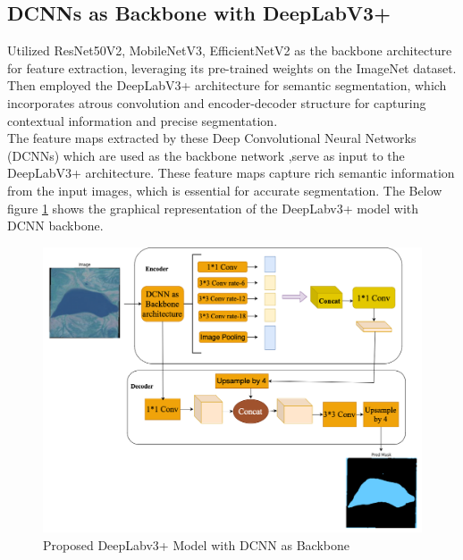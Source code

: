 \subsection{DCNNs as Backbone with DeepLabV3+}
Utilized ResNet50V2, MobileNetV3, EfficientNetV2 as the backbone architecture for feature extraction, leveraging its pre-trained weights on the ImageNet dataset.\\
Then employed the DeepLabV3+ architecture for semantic segmentation, which incorporates atrous convolution and encoder-decoder structure for capturing contextual information and precise segmentation.\\
The feature maps extracted by these Deep Convolutional Neural Networks (DCNNs) which are used as the backbone network ,serve as
input to the DeepLabV3+ architecture. These feature maps capture rich semantic information from the input images, which is essential for accurate segmentation.
The Below figure \ref{work} shows the graphical representation of the DeepLabv3+ model with DCNN backbone. \\

\begin{figure}[H]
\centering
\includegraphics[width=1.06\textwidth]{figs/deeplab.png}
\caption{Proposed DeepLabv3+ Model with DCNN as Backbone}
\label{work}
\end{figure}


